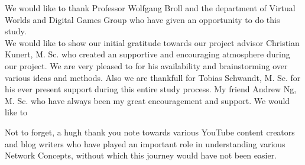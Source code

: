 \documentclass[
11pt, %
english, %
singlespacing, %
headsepline, %
]{mediaproject} %
\begin{document}

\begin{acknowledgements}
\addchaptertocentry{\acknowledgementname} %
We would like to thank Professor Wolfgang Broll and the department of Virtual Worlds and Digital Games Group who have given an opportunity to do this study.\\

We would like to show our initial gratitude towards our project advisor Christian Kunert, M. Sc. who created an supportive and encouraging atmosphere during our project. We are very pleased to for his availability and brainstorming over various ideas and methods. Also we are thankfull for Tobias Schwandt, M. Sc. for his ever present support during this entire study process. My friend Andrew Ng, M. Sc. who have always been my great encouragement and support. We would like to  

Not to forget, a hugh thank you note towards various YouTube content creators and blog writers who have played an important role in understanding various Network Concepts, without which this journey would have not been easier. 


\end{acknowledgements}


\tableofcontents %

\listoffigures %

\listoftables %



%
\end{document}
